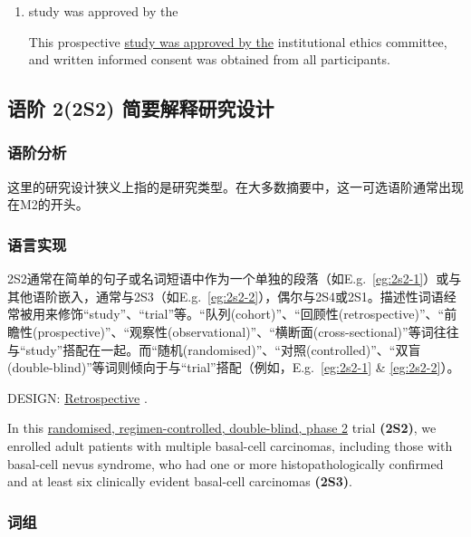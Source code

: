 \documentclass[a4paper]{ctexbook}
\begin{document}
    \begin{enumerate}
      \item study was approved by the
      \begin{eg}
        This prospective \uline{study was approved by the} institutional ethics committee, and written informed consent was obtained from all participants.
      \end{eg}
    \end{enumerate}

  \subsection{语阶 2(2S2) 简要解释研究设计}

    \subsubsection{语阶分析}

    这里的研究设计狭义上指的是研究类型。在大多数摘要中，这一可选语阶通常出现在M2的开头。

    \subsubsection{语言实现}

    2S2通常在简单的句子或名词短语中作为一个单独的段落（如E.g.~\ref{eg:2s2-1}）或与其他语阶嵌入，通常与2S3（如E.g.~\ref{eg:2s2-2}），偶尔与2S4或2S1。描述性词语经常被用来修饰“study”、“trial”等。“队列(cohort)”、“回顾性(retrospective)”、“前瞻性(prospective)”、“观察性(observational)”、“横断面(cross-sectional)”等词往往与“study”搭配在一起。而“随机(randomised)”、“对照(controlled)”、“双盲(double-blind)”等词则倾向于与“trial”搭配（例如，E.g.~\ref{eg:2s2-1} \& \ref{eg:2s2-2}）。

    \begin{eg}[label={eg:2s2-1}]{}
      DESIGN: \uline{Retrospective} .
    \end{eg}

    \begin{eg}[label={eg:2s2-2}]{}
      In this \uline{randomised, regimen-controlled, double-blind, phase 2} trial \textbf{(2S2)}, we enrolled adult patients with multiple basal-cell carcinomas, including those with basal-cell nevus syndrome, who had one or more histopathologically confirmed and at least six clinically evident basal-cell carcinomas \textbf{(2S3)}.
    \end{eg}

    \subsubsection{词组}
\end{document}
